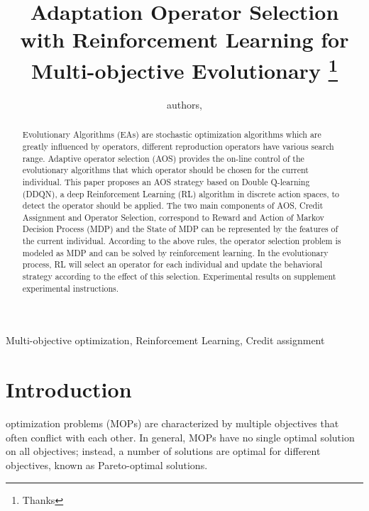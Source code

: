 \documentclass[journal]{IEEEtran}
\newcommand{\TODO}[1]{\textcolor[rgb]{1.00,0.40,0.22}{#1}}
\begin{document}
\title{{Adaptation Operator Selection with Reinforcement Learning for Multi-objective Evolutionary}
  \thanks{Thanks}}
\author{
  authors,
}%



\maketitle

\begin{abstract}
  Evolutionary Algorithms (EAs) are stochastic optimization algorithms which are greatly influenced by operators, different reproduction operators have various search range.
  Adaptive operator selection (AOS) provides the on-line control of the evolutionary algorithms that which operator should be chosen for the current individual.
  This paper proposes an AOS strategy based on Double Q-learning (DDQN), a deep Reinforcement Learning (RL) algorithm in discrete action spaces, to detect the operator should be applied.
  The two main components of AOS, Credit Assignment and Operator Selection, correspond to Reward and Action of Markov Decision Process (MDP) and the State of MDP can be represented by the features of the current individual. According to the above rules, the operator selection problem is modeled as MDP and can be solved by reinforcement learning. In the evolutionary process, RL will select an operator for each individual and update the behavioral strategy according to the effect of this selection. Experimental results on \TODO{supplement experimental instructions}.
\end{abstract}

\begin{IEEEkeywords}
  Multi-objective optimization, Reinforcement Learning, Credit assignment
\end{IEEEkeywords}

\section{Introduction}
 optimization problems (MOPs) are characterized by multiple objectives that often conflict with each other\cite{zhang2014efficient}. In general, MOPs have no single optimal solution on all objectives; instead, a number of solutions are optimal for different objectives, known as Pareto-optimal solutions.
\end{document}
